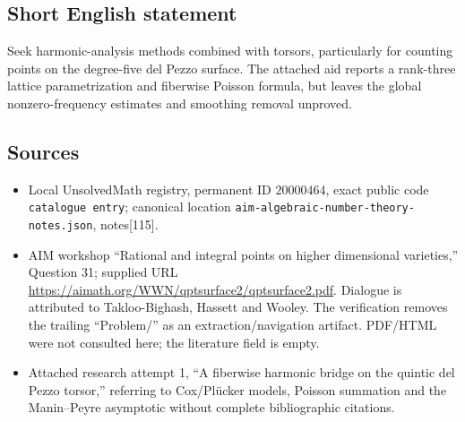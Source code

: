\documentclass[11pt]{article}
\begin{document}
\subsection{Short English statement}
Seek harmonic-analysis methods combined with torsors, particularly for counting points on the degree-five del Pezzo surface. The attached aid reports a rank-three lattice parametrization and fiberwise Poisson formula, but leaves the global nonzero-frequency estimates and smoothing removal unproved.
\subsection{Sources}
\begin{itemize}
\item Local UnsolvedMath registry, permanent ID \(20000464\), exact public code \texttt{catalogue entry}; canonical location \texttt{aim-algebraic-number-theory-notes.json}, notes[115].
\item AIM workshop ``Rational and integral points on higher dimensional varieties,'' Question 31; supplied URL \url{https://aimath.org/WWN/qptsurface2/qptsurface2.pdf}. Dialogue is attributed to Takloo-Bighash, Hassett and Wooley. The verification removes the trailing ``Problem/'' as an extraction/navigation artifact. PDF/HTML were not consulted here; the literature field is empty.
\item Attached research attempt 1, ``A fiberwise harmonic bridge on the quintic del Pezzo torsor,'' referring to Cox/Pl\"ucker models, Poisson summation and the Manin--Peyre asymptotic without complete bibliographic citations.
\end{itemize}
\end{document}
